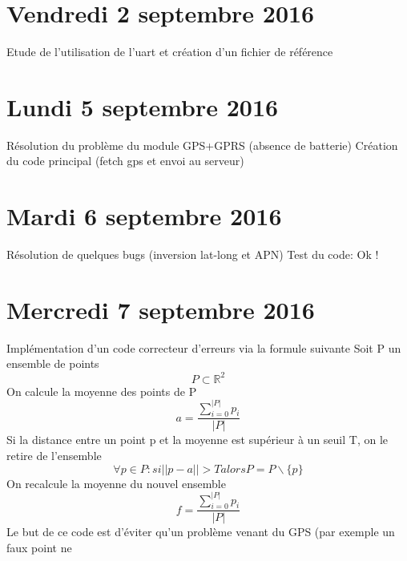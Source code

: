\documentclass[a4paper,11pt]{article}
\begin{document}
\section{Vendredi 2 septembre 2016}
Etude de l'utilisation de l'uart et création d'un fichier de référence

\section{Lundi 5 septembre 2016}
Résolution du problème du module GPS+GPRS (absence de batterie) \newline
Création du code principal (fetch gps et envoi au serveur) \newline

\section{Mardi 6 septembre 2016}
Résolution de quelques bugs (inversion lat-long et APN) \newline
Test du code: Ok !

\section{Mercredi 7 septembre 2016}
Implémentation d'un code correcteur d'erreurs via la formule suivante
Soit P un ensemble de points
\begin{equation*}
P \subset \mathbb{R}^2
\end{equation*}
On calcule la moyenne des points de P
\begin{equation*}
a = \frac{\sum\limits_{i=0}^{|P|} p_i}{|P|}
\end{equation*}
Si la distance entre un point p et la moyenne est supérieur à un seuil T, on le retire de l'ensemble
\begin{equation*}
\forall p \in P : si ||p-a|| > T  alors  P = P\backslash\{p\}
\end{equation*}
On recalcule la moyenne du nouvel ensemble
\begin{equation*}
f = \frac{\sum\limits_{i=0}^{|P|} p_i}{|P|}
\end{equation*}
Le but de ce code est d'éviter qu'un problème venant du GPS (par exemple un faux point ne 
\end{document}
